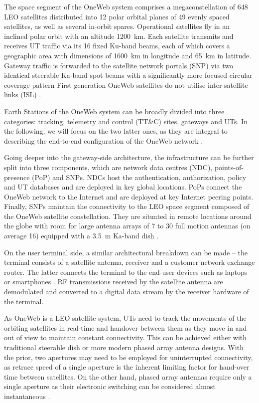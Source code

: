 \documentclass[english, 12pt, a4paper, elec, utf8, a-1b, online]{aaltothesis}
\begin{document}
The space segment of the OneWeb system comprises a megaconstellation of 648 LEO satellites distributed into 12 polar orbital planes of 49 evenly spaced satellites, as well as several in-orbit spares. 
Operational satellites fly in an inclined polar orbit with an altitude \SI{1200}{\kilo\meter}.
Each satellite transmits and receives UT traffic via its 16 fixed Ku-band beams, each of which covers a geographic area with dimensions of \SI{1600}{\kilo\meter} in longitude and \SI{65}{\kilo\meter} in latitude.
Gateway traffic is forwarded to the satellite network portals (SNP) via two identical steerable Ka-band spot beams with a significantly more focused circular coverage pattern \cite{henri2020oneweb, worldvu2016loi} First generation OneWeb satellites do not utilise inter-satellite links (ISL) \cite{portillo2019technical}.

Earth Stations of the OneWeb system can be broadly divided into three categories: tracking, telemetry and control (TT\&C) sites, gateways and UTs.
In the following, we will focus on the two latter ones, as they are integral to describing the end-to-end configuration of the OneWeb network \cite{worldvu2016loi}.

Going deeper into the gateway-side architecture, the infrastructure can be further split into three components, which are network data centres (NDC), points-of-presence (PoP) and SNPs.
NDCs host the authentication, authorization, policy and UT databases and are deployed in key global locations.
PoPs connect the OneWeb network to the Internet and are deployed at key Internet peering points.
Finally, SNPs maintain the connectivity to the LEO space segment composed of the OneWeb satellite constellation.
They are situated in remote locations around the globe with room for large antenna arrays of 7 to 30 full motion antennas (on average 16) equipped with a \SI{3.5}{\meter} Ka-band dish \cite{henri2020oneweb}.

On the user terminal side, a similar architectural breakdown can be made -- the terminal consists of a satellite antenna, receiver and a customer network exchange router.
The latter connects the terminal to the end-user devices such as laptops or smartphones \cite{henri2020oneweb}. RF transmissions received by the satellite antenna are demodulated and converted to a digital data stream by the receiver hardware of the terminal.

As OneWeb is a LEO satellite system, UTs need to track the movements of the orbiting satellites in real-time and handover between them as they move in and out of view to maintain constant connectivity.
This can be achieved either with traditional steerable dish or more modern phased array antenna designs.
With the prior, two apertures may need to be employed for uninterrupted connectivity, as retrace speed of a single aperture is the inherent limiting factor for hand-over time between satellites.
On the other hand, phased array antennas require only a single aperture as their electronic switching can be considered almost instantaneous \cite{worldvu2016loi}.
\end{document}
